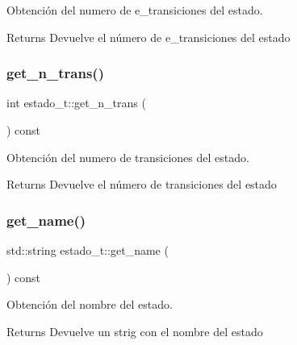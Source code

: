 Obtención del numero de e\+\_\+transiciones del estado. 

\begin{DoxyReturn}{Returns}
Devuelve el número de e\+\_\+transiciones del estado 
\end{DoxyReturn}
\mbox{\label{classestado__t_ac24561d5a9d347562fbb54c92dae297c}} 
\subsubsection{\texorpdfstring{get\+\_\+n\+\_\+trans()}{get\_n\_trans()}}
{\footnotesize\ttfamily int estado\+\_\+t\+::get\+\_\+n\+\_\+trans (\begin{DoxyParamCaption}{ }\end{DoxyParamCaption}) const\hspace{0.3cm}{\ttfamily [inline]}}



Obtención del numero de transiciones del estado. 

\begin{DoxyReturn}{Returns}
Devuelve el número de transiciones del estado 
\end{DoxyReturn}
\mbox{\label{classestado__t_ac64d1589868898d6c0d8429796ad6e43}} 
\subsubsection{\texorpdfstring{get\+\_\+name()}{get\_name()}}
{\footnotesize\ttfamily std\+::string estado\+\_\+t\+::get\+\_\+name (\begin{DoxyParamCaption}{ }\end{DoxyParamCaption}) const\hspace{0.3cm}{\ttfamily [inline]}}



Obtención del nombre del estado. 

\begin{DoxyReturn}{Returns}
Devuelve un strig con el nombre del estado 
\end{DoxyReturn}
\mbox{\label{classestado__t_a95f73fed90d04dd47ba1243aa6f63cd3}} 
